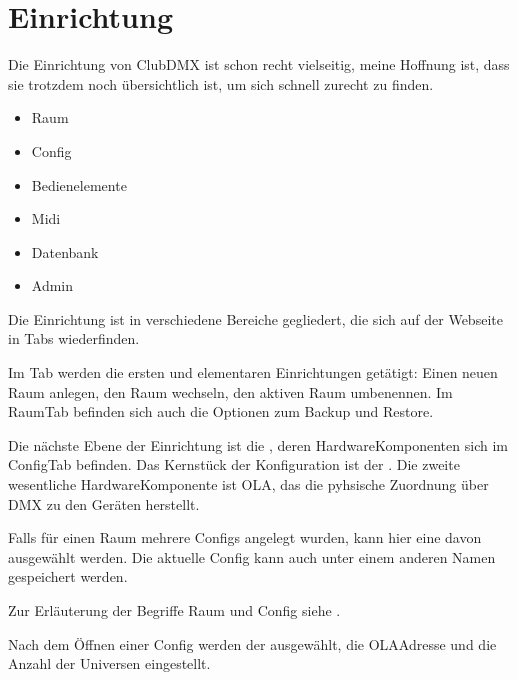 \documentclass[letterpaper,10pt,ngerman]{sphinxmanual}
\begin{document}
\section{Einrichtung}
\label{\detokenize{arbeiten:einrichtung}}
Die Einrichtung von ClubDMX ist schon recht vielseitig, meine Hoffnung ist,
dass sie trotzdem noch übersichtlich ist, um sich schnell zurecht zu finden.
\begin{itemize}
\item {} 
Raum

\item {} 
Config

\item {} 
Bedienelemente

\item {} 
Midi

\item {} 
Datenbank

\item {} 
Admin

\end{itemize}

Die Einrichtung ist in verschiedene Bereiche gegliedert, die sich auf der
Webseite in Tabs wiederfinden.

Im \sphinxhyphen{}Tab werden die ersten und elementaren Einrichtungen getätigt:
Einen neuen Raum anlegen, den Raum wechseln, den aktiven Raum umbenennen.
Im Raum\sphinxhyphen{}Tab befinden sich auch die Optionen zum Backup und Restore.

Die nächste Ebene der Einrichtung ist die , deren Hardware\sphinxhyphen{}Komponenten
sich im Config\sphinxhyphen{}Tab befinden. Das
Kernstück der Konfiguration ist der . Die zweite wesentliche
Hardware\sphinxhyphen{}Komponente ist OLA, das die pyhsische Zuordnung über DMX zu den
Geräten herstellt.

Falls  für einen Raum
mehrere Configs angelegt wurden, kann hier eine davon ausgewählt werden. Die
aktuelle Config kann auch unter einem anderen Namen gespeichert werden.

Zur Erläuterung der Begriffe Raum und Config siehe {\hyperref[\detokenize{grundlagen:raum-config-label}]{}} .

Nach dem Öffnen einer Config werden der
{\hyperref[\detokenize{patch:patchlabel}]{}} ausgewählt, die OLA\sphinxhyphen{}Adresse und die Anzahl der Universen
eingestellt.
\end{document}
